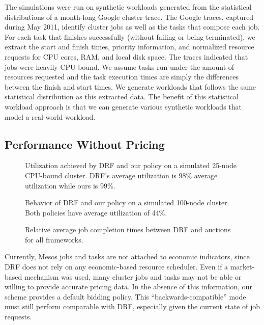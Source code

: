 \documentclass{acm_proc_article-sp}
\begin{document}
The simulations were run on synthetic workloads generated from the statistical distributions of a month-long Google cluster trace. The Google traces, captured during May 2011, identify cluster jobs as well as the tasks that compose each job. For each task that finishes successfully (without failing or being terminated), we extract the start and finish times, priority information, and normalized resource requests for CPU cores, RAM, and local disk space. The traces indicated that jobs were heavily CPU-bound. We assume tasks run under the amount of resources requested and the task execution times are simply the differences between the finish and start times. We generate workloads that follows the same statistical distribution as this extracted data. The benefit of this statistical workload approach is that we can generate various synthetic workloads that model a real-world workload.

\subsection{Performance Without Pricing\\}

\begin{figure}
\caption{Utilization achieved by DRF and our policy on a simulated 25-node CPU-bound cluster.  DRF's average utilization is 98\% average utilization while ours is 99\%.}
\label{img:util_high}
\end{figure}

\begin{figure}

\caption{Behavior of DRF and our policy on a simulated 100-node cluster. Both policies have average utilization of 44\%.}
\label{img:util_low}
\end{figure}

\begin{figure}

\caption{Relative average job completion times between DRF and auctions for all frameworks.}
\label{img:relative}
\end{figure}

Currently, Mesos jobs and tasks are not attached to economic indicators, since DRF does not rely on any economic-based resource scheduler. Even if a market-based mechanism was used, many cluster jobs and tasks may not be able or willing to provide accurate pricing data. In the absence of this information, our scheme provides a default bidding policy. This ``backwards-compatible'' mode must still perform comparable with DRF, especially given the current state of job requests.
\end{document}
